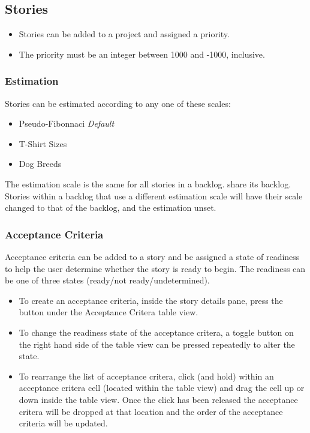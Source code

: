 \documentclass[11pt,fleqn]{book} %
\begin{document}
\subsection{Stories}

\begin{itemize}
  \item Stories can be added to a project and assigned a priority.
  \item The priority must be an integer between 1000 and -1000, inclusive.
\end{itemize}

\subsubsection{Estimation}
Stories can be estimated according to any one of these scales:
\begin{itemize}
\item Pseudo-Fibonnaci \textit{Default}
\item T-Shirt Sizes
\item Dog Breeds
\end{itemize}
The estimation scale is the same for all stories in a backlog.
share its backlog. Stories within a backlog that use a different estimation
scale will have their scale changed to that of the backlog, and the estimation unset.

\subsubsection{Acceptance Criteria}
Acceptance criteria can be added to a story and be assigned a state of readiness to help the user determine whether the
story is ready to begin. The readiness can be one of three states (ready/not ready/undetermined).
\begin{itemize}
  \item To create an acceptance criteria, inside the story details pane, press the \menu{+} button under the Acceptance Critera table
  view.
  \item To change the readiness state of the acceptance critera, a toggle button on the right hand side of the table view
  can be pressed repeatedly to alter the state.
  \item To rearrange the list of acceptance critera, click (and hold) within an acceptance critera cell (located within the table view)
  and drag the cell up or down inside the table view. Once the click has been released the acceptance critera will be
  dropped at that location and the order of the acceptance criteria will be updated.
\end{itemize}
\end{document}
